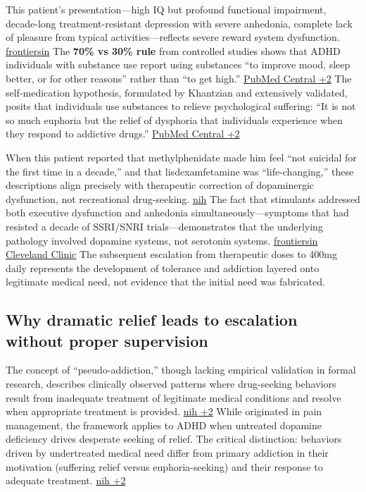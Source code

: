 This patient's presentation---high IQ but profound functional impairment, decade-long treatment-resistant depression with severe anhedonia, complete lack of pleasure from typical activities---reflects severe reward system dysfunction. \href{https://www.frontiersin.org/journals/psychiatry/articles/10.3389/fpsyt.2019.00311/full}{frontiersin} The \textbf{70\% vs 30\% rule} from controlled studies shows that ADHD individuals with substance use report using substances ``to improve mood, sleep better, or for other reasons'' rather than ``to get high.'' \href{https://pmc.ncbi.nlm.nih.gov/articles/PMC2676785/}{PubMed Central +2} The self-medication hypothesis, formulated by Khantzian and extensively validated, posits that individuals use substances to relieve psychological suffering: ``It is not so much euphoria but the relief of dysphoria that individuals experience when they respond to addictive drugs.'' \href{https://pmc.ncbi.nlm.nih.gov/articles/PMC2676785/}{PubMed Central +2}

When this patient reported that methylphenidate made him feel ``not suicidal for the first time in a decade,'' and that lisdexamfetamine was ``life-changing,'' these descriptions align precisely with therapeutic correction of dopaminergic dysfunction, not recreational drug-seeking. \href{https://pmc.ncbi.nlm.nih.gov/articles/PMC4227391/}{nih} The fact that stimulants addressed both executive dysfunction and anhedonia simultaneously---symptoms that had resisted a decade of SSRI/SNRI trials---demonstrates that the underlying pathology involved dopamine systems, not serotonin systems. \href{https://www.frontiersin.org/journals/psychiatry/articles/10.3389/fpsyt.2019.00311/full}{frontiersin} \href{https://my.clevelandclinic.org/health/treatments/11766-adhd-medication}{Cleveland Clinic} The subsequent escalation from therapeutic doses to 400mg daily represents the development of tolerance and addiction layered onto legitimate medical need, not evidence that the initial need was fabricated.

\subsection{Why dramatic relief leads to escalation without proper supervision}\label{10c_self_medication-why-dramatic-relief-leads-to-escalation-without-proper-supervision}

The concept of ``pseudo-addiction,'' though lacking empirical validation in formal research, describes clinically observed patterns where drug-seeking behaviors result from inadequate treatment of legitimate medical conditions and resolve when appropriate treatment is provided. \href{https://pmc.ncbi.nlm.nih.gov/articles/PMC4628053/}{nih +2} While originated in pain management, the framework applies to ADHD when untreated dopamine deficiency drives desperate seeking of relief. The critical distinction: behaviors driven by undertreated medical need differ from primary addiction in their motivation (suffering relief versus euphoria-seeking) and their response to adequate treatment. \href{https://pmc.ncbi.nlm.nih.gov/articles/PMC4628053/}{nih +2}

